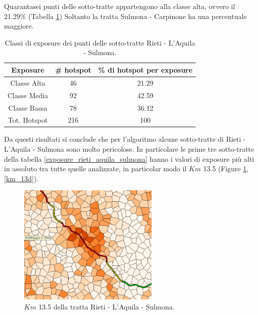 Quarantasei punti delle sotto-tratte appartengono alla classe alta, ovvero il 21.29\% (Tabella \ref{risultati_rieti_aquila_sulmona}) Soltanto la tratta Sulmona - Carpinone ha una percentuale maggiore. 

\begin{table}[H]
	\centering
	\begin{tabular}{|c|c|c|}
		\hline
		\rowcolor[HTML]{C0C0C0} 
		\textbf{Exposure} & \textbf{\# hotspot} & \textbf{\% di hotspot per exposure} \\ \hline
		Classe Alta       & 46                  & 21.29                                   \\ \hline
		Classe Media      & 92                 & 42.59                         \\ \hline
		Classe Bassa      & 78              & 36.12                            \\ \hline
		Tot. Hotspot      & 216               & 100                                 \\ \hline
	\end{tabular}
	\caption{Classi di exposure dei punti delle sotto-tratte Rieti - L'Aquila - Sulmona.}
	\label{risultati_rieti_aquila_sulmona}
\end{table}
Da questi risultati si conclude che per l'algoritmo alcune sotto-tratte di Rieti - L'Aquila - Sulmona sono molto pericolose.
In particolare le prime tre sotto-tratte della tabella \ref{exposure_rieti_aquila_sulmona} hanno i valori di exposure più alti in assoluto tra tutte quelle analizzate, in particolar modo il $Km$ 13.5 (Figure \ref{km_13}, \ref{km_13d}). 

\begin{figure}[H]
	\centering
	\includegraphics[width=0.6\textwidth]{images/rietizoom}
	\caption{$Km$ 13.5 della tratta Rieti - L'Aquila - Sulmona.}
	\label{km_13}
\end{figure}

